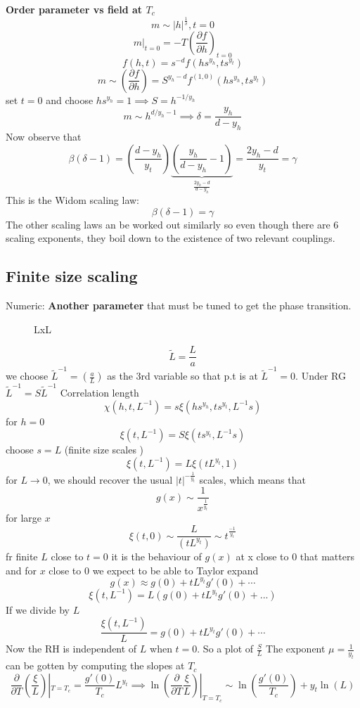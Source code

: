 \documentclass[11pt]{book}
\theoremstyle{definition}
\begin{document}
\textbf{Order parameter vs field at $ T_c $ }
\[ m \sim |h|^{\frac{1}{\delta}}, t = 0 \] 
\[ m|_{t=0} = -T\left( \frac{\partial f}{\partial h} \right)_{t=0}  \] 
\[ f(h,t) = s^{-d} f(hs^{y_h}, ts^{y_t}) \] 
\[ m \sim \left( \frac{\partial f}{\partial h} \right) = S^{y_h - d} f^{(1,0)}(hs^{y_h}, ts^{y_t})  \] 
set $ t=0 $ and choose $ hs^{y_h} = 1 \implies S = h^{-1/y_h}$ 
\[ m \sim h^{d/y_h -1} \implies \delta = \frac{y_h}{d-y_h} \] 
Now observe that
\[ \beta (\delta-1) = \left(\frac{d-y_h}{y_t} \right) 
\underbrace{\left( \frac{y_h}{d-y_h} -1 \right)}_{\frac{2y_h-d}{d-y_h}} = \frac{2y_h-d}{y_t}=\gamma\] 
This is the Widom scaling law:
\[ \beta(\delta-1) = \gamma\] 
The other scaling laws an be worked out similarly so even though there are $ 6 $ scaling exponents, they boil down to the existence of two relevant couplings.
\subsection{Finite size scaling}
Numeric: \textbf{Another parameter} that must be tuned to get the phase transition. 
\begin{figure}[htpb]
\begin{center}

\end{center}
\caption{LxL}%
\end{figure}

\[ \tilde L = \frac{L}{a} \] 
we choose $ \tilde L^{-1} = (\frac{a}{L}) $ as the 3rd variable so that p.t is at $ \tilde L^{-1} = 0 $.  
Under RG
$\tilde L^{-1} = S \tilde L^{-1} $
Correlation length
\[ \chi(h,t,L^{-1}) = s \xi(hs^{y_h}, ts^{y_t}, L^{-1}s)\] 
for $ h=0 $ 
\[ \xi(t,L^{-1}) = S \xi(ts^{y_t}, L^{-1}s) \] 
choose $ s=L $ (finite size scales )
\[ \xi(t,L^{-1}) = L\xi(tL^{y_t}, 1) \] 
for $ L \to 0 $, we should recover the usual $ |t|^{-\frac{1}{y_t}} $ scales, which means that 
\[ g(x) \sim \frac{1}{x^{\frac{1}{y_t}}} \] for large $ x $ 
\[ \xi(t,0) \sim \frac{L}{(tL^{y_t})} \sim t^{\frac{-1}{y_t}}\] 
fr finite $L $ close to $ t=0 $ it is the behaviour of $ g(x) $ at x close to $ 0 $ that matters and for $ x $ close to $ 0 $ we expect to be able to Taylor expand 
\[ g(x) \approx g(0) + tL^{y_t} g'(0) + \cdots\] 
\[ \xi(t,L^{-1}) =L\left( g(0) +tL^{y_t} g'(0) + ... \right)  \] 
If we divide by $ L $ 
\[ \frac{\xi(t,L^{-1})}{L} = g(0) + tL^{y_t} g'(0) + \cdots \] 
Now the RH is independent of $ L $ when $ t=0 $.
So a plot of $ \frac{S}{L} $ 
The exponent $ \mu = \frac{1}{y_t} $ can be gotten by computing the slopes at $ T_c $  
\[ \frac{\partial }{\partial T} \left( \frac{\xi}{L} \right) |_{T=T_c} = \frac{g'(0)}{T_c} L^{y_t} 
\implies \ln(\frac{\partial }{\partial T} \frac{\xi}{L} )|_{T=T_c} 
\sim \ln \left( \frac{g'(0)}{T_c} \right)
+ y_t \ln(L)  \] 
\end{document}
